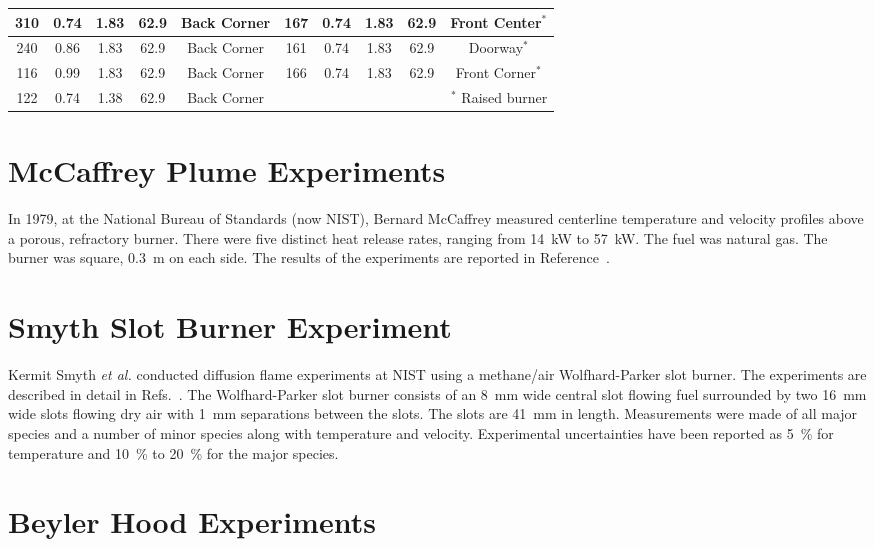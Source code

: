 \begin{table}[h!]
\begin{center}
\begin{tabular}{|c|c|c|c|c||c|c|c|c|c|}
310     & 0.74      & 1.83          &  62.9      & Back Corner  & 167   & 0.74      & 1.83        &  62.9         & Front Center$^*$    \\ \hline
240     & 0.86      & 1.83          &  62.9      & Back Corner  & 161   & 0.74      & 1.83        &  62.9         & Doorway$^*$         \\ \hline
116     & 0.99      & 1.83          &  62.9      & Back Corner  & 166   & 0.74      & 1.83        &  62.9         & Front Corner$^*$    \\ \hline
122     & 0.74      & 1.38          &  62.9      & Back Corner  &  \multicolumn{5}{r|}{$^*$ Raised burner}                   \\ \hline
\end{tabular}
\end{center}
\label{Steckler_Table}
\end{table}


\clearpage

\section{McCaffrey Plume Experiments}

In 1979, at the National Bureau of Standards (now NIST), Bernard McCaffrey measured centerline temperature and velocity profiles above a porous,
refractory burner. There were five distinct heat release rates, ranging from 14~kW to 57~kW. The fuel was natural gas. The burner was square, 0.3~m on each side.
The results of the experiments are reported in Reference~\cite{McCaffrey:NBSIR_79-1910}.


\section{Smyth Slot Burner Experiment}

Kermit Smyth {\em et al.} conducted diffusion flame experiments at NIST using a methane/air Wolfhard-Parker slot burner.  The experiments are described in
detail in Refs.~\cite{Norton:1,Smyth:1}.  The Wolfhard-Parker slot burner consists of an 8~mm wide
central slot flowing fuel surrounded by two 16~mm wide slots flowing dry air with 1~mm separations between the slots.
The slots are 41~mm in length.  Measurements were made of all major species and a number of minor species along with temperature
and velocity.  Experimental uncertainties have been reported as 5~\% for temperature  and 10~\% to 20~\%
for the major species.


\section{Beyler Hood Experiments}

